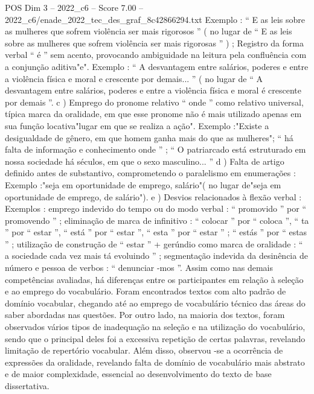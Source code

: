 \begin{textsample}{POS Dim 3 – 2022\_c6 – Score 7.00 – 2022\_c6/enade\_2022\_tec\_des\_graf\_8c42866294.txt}
Exemplo : “ E as leis sobre as mulheres que sofrem violência ser mais rigorosos ” ( no lugar de “ E as leis sobre as mulheres que sofrem violência ser mais rigorosas ” ) ; Registro da forma verbal “ é ” sem acento, provocando ambiguidade na leitura pela confluência com a conjunção aditiva"e".
Exemplo : “ A desvantagem entre salários, poderes e entre a violência física e moral e crescente por demais... ” ( no lugar de “ A desvantagem entre salários, poderes e entre a violência física e moral é crescente por demais ”. c ) Emprego do pronome relativo “ onde ” como relativo universal, típica marca da oralidade, em que esse pronome não é mais utilizado apenas em sua função locativa"lugar em que se realiza a ação".
Exemplo :"Existe a desigualdade de gênero, em que homem ganha mais do que as mulheres"; “ há falta de informação e conhecimento onde ” ; “ O patriarcado está estruturado em nossa sociedade há séculos, em que o sexo masculino... ” d ) Falta de artigo definido antes de substantivo, comprometendo o paralelismo em enumerações : Exemplo :"seja em oportunidade de emprego, salário"( no lugar de"seja em oportunidade de emprego, de salário"). e ) Desvios relacionados à flexão verbal : Exemplos : emprego indevido do tempo ou do modo verbal : “ promovido ” por “ promovendo ” ; eliminação de marca de infinitivo : “ colocar ” por “ coloca ”, “ ta ” por “ estar ”, “ está ” por “ estar ”, “ esta ” por “ estar ” ; “ estás ” por “ estas ” ; utilização de construção de “ estar ” + gerúndio como marca de oralidade : “ a sociedade cada vez mais tá evoluindo ” ; segmentação indevida da desinência de número e pessoa de verbos : “ denunciar -mos ”.
Assim como nas demais competências avaliadas, há diferenças entre os participantes em relação à seleção e ao emprego do vocabulário.
Foram encontrados textos com alto padrão de domínio vocabular, chegando até ao emprego de vocabulário técnico das áreas do saber abordadas nas questões.
Por outro lado, na maioria dos textos, foram observados vários tipos de inadequação na seleção e na utilização do vocabulário, sendo que o principal deles foi a excessiva repetição de certas palavras, revelando limitação de repertório vocabular.
Além disso, observou -se a ocorrência de expressões da oralidade, revelando falta de domínio de vocabulário mais abstrato e de maior complexidade, essencial ao desenvolvimento do texto de base dissertativa.

\end{textsample}
